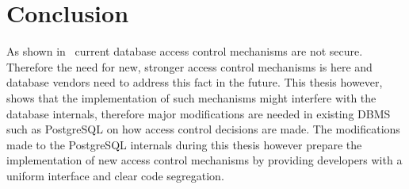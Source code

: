 \section{Conclusion}

As shown in~\cite{guarnieri2016strong} current database access control mechanisms are not secure.
%
Therefore the need for new, stronger access control mechanisms is here and database vendors need to address this fact in the future.
%
This thesis however, shows that the implementation of such mechanisms might interfere with the database internals, therefore major modifications are needed in existing DBMS such as PostgreSQL on how access control decisions are made.
%
The modifications made to the PostgreSQL internals during this thesis however prepare the implementation of new access control mechanisms by providing developers with a uniform interface and clear code segregation.
%
